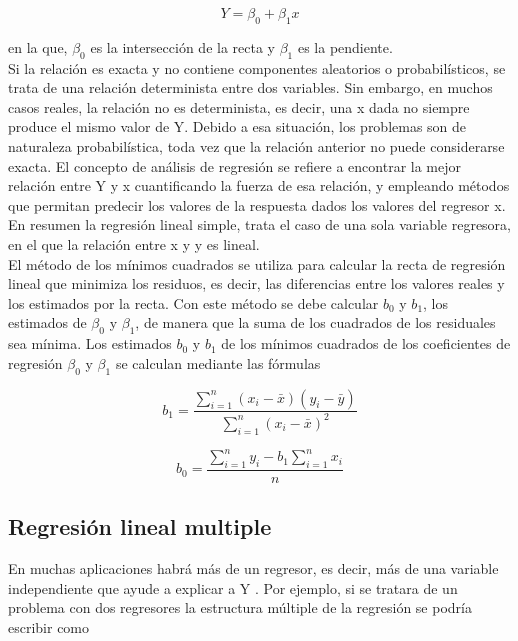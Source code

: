 \documentclass[conference]{IEEEtran}
\begin{document}
\begin{equation}
Y= \beta_0 + \beta_1x
\end{equation}

en la que, $\beta_0$ es la intersección de la recta y $\beta_1$ es la pendiente.\\

Si la relación es exacta y no contiene componentes aleatorios o probabilísticos, se trata de una relación determinista entre dos variables. Sin embargo, en muchos casos reales, la relación no es determinista, es decir, una x dada no siempre produce el mismo valor de Y. Debido a esa situación, los problemas son de naturaleza probabilística, toda vez que la relación anterior no puede considerarse exacta. El concepto de análisis de regresión se refiere a encontrar la mejor relación entre Y y x cuantificando la fuerza de esa relación, y empleando métodos que permitan predecir los valores de la respuesta dados los valores del regresor x. En resumen la regresión lineal simple, trata el caso de una sola variable regresora, en el que la relación entre x y y es lineal.\\

El método de los mínimos cuadrados se utiliza para calcular la recta de regresión lineal que minimiza los residuos, es decir, las diferencias entre los valores reales y los estimados por la recta. Con este método se debe calcular $b_0$ y $b_1$, los estimados de $\beta_0$ y $\beta_1$, de manera que la suma de los cuadrados de los residuales sea mínima. Los estimados $b_0$ y $b_1$ de los mínimos cuadrados de los coeficientes de regresión $\beta_0$ y $\beta_1$ se calculan mediante las fórmulas

\begin{equation}
b_1= \frac{\sum_{i=1}^{n}(x_i-\bar{x})(y_i-\bar{y})}{\sum_{i=1}^{n}(x_i-\bar{x})^{2}}
\end{equation}

\begin{equation}
b_0= \frac{\sum_{i=1}^{n} y_i - b_1 \sum_{i=1}^{n}x_i}{n}
\end{equation}

\subsection{Regresión lineal multiple}
En muchas aplicaciones habrá más de un regresor, es decir, más de una variable independiente que ayude a explicar a Y \cite{b2}. Por ejemplo, si se tratara de un problema con dos regresores la estructura múltiple de la regresión se podría escribir como
\end{document}
